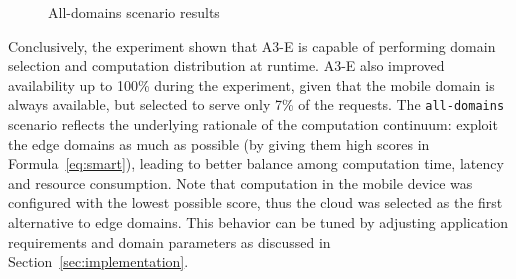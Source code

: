 \begin{figure}[htb]
\centering
	\captionsetup[subfigure]{width=0.32\textwidth}
	\captionsetup[subfigure]{width=0.32\textwidth}
	\captionsetup[subfigure]{width=0.32\textwidth}
	\setlength{\belowcaptionskip}{-10pt}
	\caption{All-domains scenario results} \label{fig:all-domains}
\end{figure}

Conclusively, the experiment shown that A3-E is capable of performing domain selection and computation distribution at runtime. A3-E also improved availability up to 100\% during the experiment, given that the mobile domain is always available, but selected to serve only 7\% of the requests.
The \texttt{all-domains} scenario reflects the underlying rationale of the computation continuum: exploit the edge domains as much as possible (by giving them high scores in Formula~\ref{eq:smart}), leading to better balance among computation time, latency and resource consumption. 
Note that computation in the mobile device was configured with the lowest possible score, thus the cloud was selected as the first alternative to edge domains. This behavior can be tuned by adjusting application requirements and domain parameters as discussed in Section~\ref{sec:implementation}.

